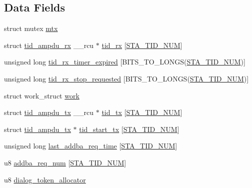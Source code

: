 \subsection*{Data Fields}
\begin{DoxyCompactItemize}
\item 
struct mutex \hyperlink{structsta__ampdu__mlme_a06f637951b74c996f2e4987a7be1dbdd}{mtx}
\item 
struct \hyperlink{structtid__ampdu__rx}{tid\-\_\-ampdu\-\_\-rx} \-\_\-\-\_\-rcu $\ast$ \hyperlink{structsta__ampdu__mlme_a9f02b8e803c3fad3c7f746477739b6c3}{tid\-\_\-rx} \mbox{[}\hyperlink{sta__info_8h_a8376226f35c3c806965ac03355cc1a00}{S\-T\-A\-\_\-\-T\-I\-D\-\_\-\-N\-U\-M}\mbox{]}
\item 
unsigned long \hyperlink{structsta__ampdu__mlme_a53e1819c9e1189bae325027254946f53}{tid\-\_\-rx\-\_\-timer\-\_\-expired} \mbox{[}B\-I\-T\-S\-\_\-\-T\-O\-\_\-\-L\-O\-N\-G\-S(\hyperlink{sta__info_8h_a8376226f35c3c806965ac03355cc1a00}{S\-T\-A\-\_\-\-T\-I\-D\-\_\-\-N\-U\-M})\mbox{]}
\item 
unsigned long \hyperlink{structsta__ampdu__mlme_aa9b2d44581dfa6af54bea5ad684e8b5f}{tid\-\_\-rx\-\_\-stop\-\_\-requested} \mbox{[}B\-I\-T\-S\-\_\-\-T\-O\-\_\-\-L\-O\-N\-G\-S(\hyperlink{sta__info_8h_a8376226f35c3c806965ac03355cc1a00}{S\-T\-A\-\_\-\-T\-I\-D\-\_\-\-N\-U\-M})\mbox{]}
\item 
struct work\-\_\-struct \hyperlink{structsta__ampdu__mlme_a623997e11b94d7c467ce26627cc488a2}{work}
\item 
struct \hyperlink{structtid__ampdu__tx}{tid\-\_\-ampdu\-\_\-tx} \-\_\-\-\_\-rcu $\ast$ \hyperlink{structsta__ampdu__mlme_acc2de99b986d5fa4b83081a609014228}{tid\-\_\-tx} \mbox{[}\hyperlink{sta__info_8h_a8376226f35c3c806965ac03355cc1a00}{S\-T\-A\-\_\-\-T\-I\-D\-\_\-\-N\-U\-M}\mbox{]}
\item 
struct \hyperlink{structtid__ampdu__tx}{tid\-\_\-ampdu\-\_\-tx} $\ast$ \hyperlink{structsta__ampdu__mlme_a11dbf950521d406406f6689d3db802fa}{tid\-\_\-start\-\_\-tx} \mbox{[}\hyperlink{sta__info_8h_a8376226f35c3c806965ac03355cc1a00}{S\-T\-A\-\_\-\-T\-I\-D\-\_\-\-N\-U\-M}\mbox{]}
\item 
unsigned long \hyperlink{structsta__ampdu__mlme_a811661f4c9a6505bfa7d3f74771e3157}{last\-\_\-addba\-\_\-req\-\_\-time} \mbox{[}\hyperlink{sta__info_8h_a8376226f35c3c806965ac03355cc1a00}{S\-T\-A\-\_\-\-T\-I\-D\-\_\-\-N\-U\-M}\mbox{]}
\item 
u8 \hyperlink{structsta__ampdu__mlme_a87d5e7167b24cc6e336ecf08e9e15d06}{addba\-\_\-req\-\_\-num} \mbox{[}\hyperlink{sta__info_8h_a8376226f35c3c806965ac03355cc1a00}{S\-T\-A\-\_\-\-T\-I\-D\-\_\-\-N\-U\-M}\mbox{]}
\item 
u8 \hyperlink{structsta__ampdu__mlme_a8dd4efd8eb6b5f60ae2295f55a4600a4}{dialog\-\_\-token\-\_\-allocator}
\end{DoxyCompactItemize}


